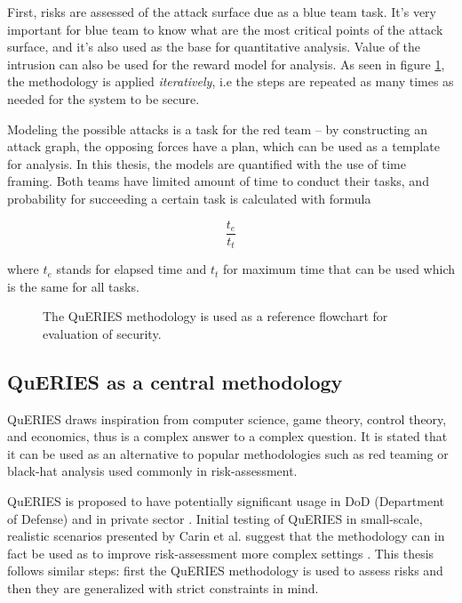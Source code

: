First, risks are assessed of the attack surface due as a blue team
task. It's very important for blue team to know what are the most
critical points of the attack surface, and it's also used as the base
for quantitative analysis. Value of the intrusion can also be used for
the reward model for analysis. As seen in figure \ref{queries}, the
methodology is applied \textit{iteratively}, i.e the steps are
repeated as many times as needed for the system to be secure.

Modeling the possible attacks is a task for the red team – by
constructing an attack graph, the opposing forces have a plan, which
can be used as a template for analysis. In this thesis, the models are quantified with the use of time
framing. Both teams have limited amount of time to conduct their
tasks, and probability for succeeding a certain task is calculated
with formula

\[ \frac{t_e}{t_t} \]

where \(t_e\) stands for elapsed time and \(t_t\) for maximum time
that can be used which is the same for all tasks.

\begin{figure}[t!]
\centerline{}
\caption{The QuERIES methodology is used as a reference flowchart for
  evaluation of security. \cite{hughes2013quantitative}}
\label{queries}
\end{figure}
\subsection{QuERIES as a central methodology} \label{queriesasmethodology}

QuERIES draws inspiration from computer science, game theory, control
theory, and economics, thus is a complex answer to a complex
question. It is stated that it can be used as an alternative to
popular methodologies such as red teaming or black-hat analysis used
commonly in risk-assessment. \cite{carin2008cybersecurity}

QuERIES is proposed to have potentially significant usage in DoD
(Department of Defense) and in private sector
\cite{carin2008cybersecurity}. Initial testing of QuERIES in
small-scale, realistic scenarios presented by Carin et al. suggest
that the methodology can in fact be used as to improve risk-assessment
more complex settings \cite{carin2008cybersecurity}. This thesis
follows similar steps: first the QuERIES methodology is used to assess
risks and then they are generalized with strict constraints in mind.

